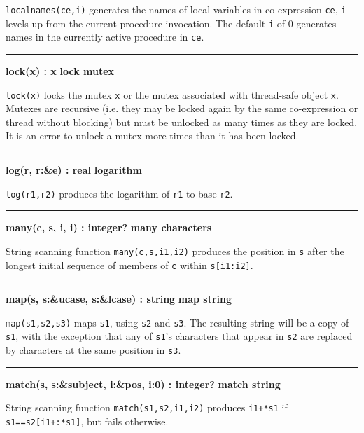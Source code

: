 \noindent
{}\texttt{localnames(ce,i)} generates the
names of local variables in co-expression \texttt{ce}, \texttt{i}
levels up from the current procedure invocation. The default \texttt{i} of 0
generates names in the currently active procedure in \texttt{ce}.

\bigskip\hrule\vspace{0.1cm}
\noindent
{\bf lock(x) : x } \hfill {\bf lock mutex}

\noindent
{}\texttt{lock(x)} locks the mutex \texttt{x} or the mutex
associated with thread-safe object \texttt{x}.
Mutexes are recursive (i.e. they may be locked again by the same co-expression
or thread without blocking) but must be unlocked as many times as they are
locked. It is an error to unlock a mutex more times than it has been locked.

\bigskip\hrule\vspace{0.1cm}
\noindent
{\bf log(r, r:\&e) : real } \hfill {\bf logarithm}

\noindent
{}\texttt{log(r1,r2)} produces the logarithm of
\texttt{r1} to base \texttt{r2}.

\bigskip\hrule\vspace{0.1cm}
\noindent
{\bf many(c, s, i, i) : integer? } \hfill {\bf many characters}

\noindent
{}String scanning function \texttt{many(c,s,i1,i2)} produces
the position in \texttt{s} after the longest initial sequence of
members of \texttt{c} within \texttt{s[i1:i2]}.

\bigskip\hrule\vspace{0.1cm}
\noindent
{\bf map(s, s:\&ucase, s:\&lcase) : string } \hfill {\bf map string}

\noindent
{}\texttt{map(s1,s2,s3)} maps \texttt{s1}, using
\texttt{s2} and \texttt{s3}. The resulting string will be a copy of
\texttt{s1}, with the exception that any of
\texttt{s1}'s characters that appear in \texttt{s2}
are replaced by characters at the same position in \texttt{s3}.

\bigskip\hrule\vspace{0.1cm}
\noindent
{\bf match(s, s:\&subject, i:\&pos, i:0) : integer? } \hfill {\bf match string}

\noindent
{}String scanning function \texttt{match(s1,s2,i1,i2)}
produces \texttt{i1+*s1} if \texttt{s1==s2[i1+:*s1]}, but fails
otherwise.

